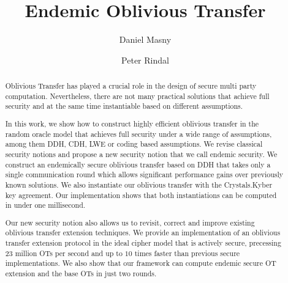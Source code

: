 \documentclass[10pt]{article}
\title{Endemic Oblivious Transfer}
\author{Daniel Masny \and Peter Rindal}
\institute{VISA Research}
\begin{document}
\maketitle

\begin{abstract}
Oblivious Transfer has played a crucial role in the design of secure multi party computation. Nevertheless, there are not many practical solutions that achieve full security and at the same time instantiable based on different assumptions.

In this work, we show how to construct highly efficient oblivious transfer in the random oracle model that achieves full security under a wide range of assumptions, among them DDH, CDH, LWE or coding based assumptions. We revise classical security notions and propose a new security notion that we call endemic security. We construct an endemically secure oblivious transfer based on DDH that takes only a single communication round which allows significant performance gains over previously known solutions. We also instantiate our oblivious transfer with the Crystals.Kyber key agreement. Our implementation shows that both instantiations can be computed in under one millisecond. 

Our new security notion also allows us to revisit, correct and improve existing oblivious transfer extension techniques. We provide an implementation of an oblivious transfer extension protocol in the ideal cipher model that is actively secure, precessing 23 million OTs per second and up to $10$ times faster than previous secure implementations. We also show that our framework can compute endemic secure OT extension and the base OTs in just two rounds.

\end{abstract}









% 






\appendix




%



%
\end{document}
